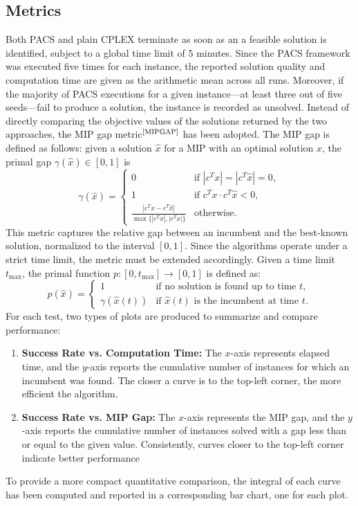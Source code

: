 \subsection{Metrics}
Both PACS and plain CPLEX terminate as soon as an a feasible solution is identified, subject to a global time limit of $5$ minutes.
Since the PACS framework was executed five times for each instance, the reported solution quality and computation time are given as the arithmetic mean across all runs.
Moreover, if the majority of PACS executions for a given instance---at least three out of five seeds---fail to produce a solution, the instance is recorded as unsolved.
Instead of directly comparing the objective values of the solutions returned by the two approaches, the MIP gap metric$^\text{\cite{MIPGAP}}$ has been adopted. The MIP gap is defined as follows: given a solution $\hat{x}$ for a MIP with an optimal solution $x$, the primal gap $\gamma(\hat{x}) \in [0,1]$ is
\begin{equation}
\gamma(\hat{x}) =
\begin{cases}
0 & \text{if } |c^T x| = |c^T \hat{x}| = 0, \\
1 & \text{if } c^T x \cdot c^T \hat{x}< 0, \\
\frac{|c^T x-c^T \hat{x}|}{\max\{|c^T \hat{x}|, |c^T x|\}} & \text{otherwise}.
\end{cases}
\end{equation}
This metric captures the relative gap between an incumbent and the best-known solution, normalized to the interval $[0,1]$.  
Since the algorithms operate under a strict time limit, the metric must be extended accordingly. Given a time limit $t_{\max}$, the primal function $p:[0,t_{\max}] \to [0,1]$ is defined as:
\begin{equation}
p(\hat{x}) =
\begin{cases}
1 & \text{if no solution is found up to time $t$}, \\
\gamma(\hat{x}(t)) & \text{if $\hat{x}(t)$ is the incumbent at time $t$}.
\end{cases}
\end{equation}
For each test, two types of plots are produced to summarize and compare performance:
\begin{enumerate}
    \item \textbf{Success Rate vs. Computation Time:}  
    The $x$-axis represents elapsed time, and the $y$-axis reports the cumulative number of instances for which an incumbent was found. The closer a curve is to the top-left corner, the more efficient the algorithm.  
    \item \textbf{Success Rate vs. MIP Gap:}  
    The $x$-axis represents the MIP gap, and the $y$-axis reports the cumulative number of instances solved with a gap less than or equal to the given value. Consistently, curves closer to the top-left corner indicate better performance 
\end{enumerate}
To provide a more compact quantitative comparison, the integral of each curve has been computed and reported in a corresponding bar chart, one for each plot.

